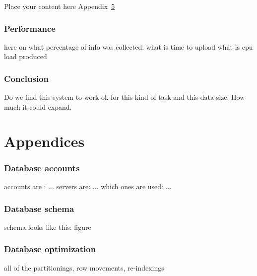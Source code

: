 \documentclass{atlasnote}
\begin{document}
Place your content here Appendix~\ref{app:DBopt}

\section{Performance}
here on what percentage of info was collected.
what is time to upload
what is cpu load produced

\section{Conclusion}
Do we find this system to work ok for this kind of task and this data size. How much it could expand.







\newpage
\appendix
\part*{Appendices}

\section{Database accounts} \label{app:DBaccounts}
accounts are : ...
servers are: ...
which ones are used: ...
\section{Database schema} \label{app:DBschema}
schema looks like this: figure

\section{Database optimization} \label{app:DBopt}
all of the partitionings, row movements, re-indexings
\end{document}
